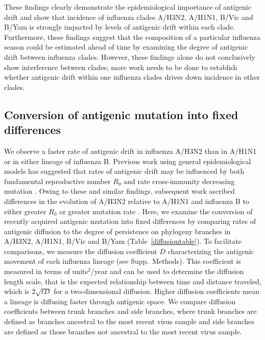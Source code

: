 \documentclass[11pt,oneside,letterpaper]{article}
\begin{document}
These findings clearly demonstrate the epidemiological importance of antigenic drift and show that incidence of influenza clades A/H3N2, A/H1N1, B/Vic and B/Yam is strongly impacted by levels of antigenic drift within each clade.
Furthermore, these findings suggest that the composition of a particular influenza season could be estimated ahead of time by examining the degree of antigenic drift between influenza clades.
However, these findings alone do not conclusively show interference between clades; more work needs to be done to establish whether antigenic drift within one influenza clades drives down incidence in other clades.

\subsection*{Conversion of antigenic mutation into fixed differences}

We observe a faster rate of antigenic drift in influenza A/H3N2 than in A/H1N1 or in either lineage of influenza B.
Previous work using general epidemiological models has suggested that rates of antigenic drift may be influenced by both fundamental reproductive number $R_0$ and rate cross-immunity decreasing mutation \cite{Gog02,Lin03}.
Owing to these and similar findings, subsequent work ascribed differences in the evolution of A/H3N2 relative to A/H1N1 and influenza B to either greater $R_0$ or greater mutation rate \cite{Ferguson03,Bedford12}.
Here, we examine the conversion of recently acquired antigenic mutation into fixed differences by comparing rates of antigenic diffusion to the degree of persistence on phylogeny branches in A/H3N2, A/H1N1, B/Vic and B/Yam (Table~\ref{diffusiontable}).
To facilitate comparisons, we measure the diffusion coefficient $D$ \cite{Pybus12} characterizing the antigenic movement of each influenza lineage (see Supp.\ Methods).
This coefficient is measured in terms of units$^2$/year and can be used to determine the diffusion length scale, that is the expected relationship between time and distance traveled, which is $2 \sqrt{t D}$ for a two-dimensional diffusion.
Higher diffusion coefficients mean a lineage is diffusing faster through antigenic space.
We compare diffusion coefficients between trunk branches and side branches, where trunk branches are defined as branches ancestral to the most recent virus sample and side branches are defined as those branches not ancestral to the most recent virus sample.
\end{document}
